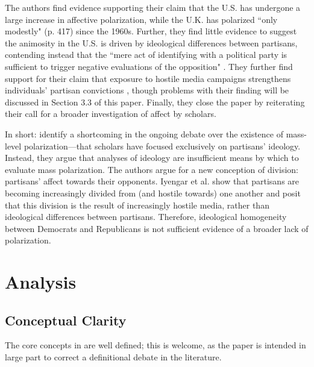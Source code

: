 \documentclass[12pt]{article}
\begin{document}
The authors find evidence supporting their claim that the U.S. has undergone a large increase in affective polarization, while the U.K. has polarized ``only modestly" (p. 417) since the 1960s. Further, they find little evidence to suggest the animosity in the U.S. is driven by ideological differences between partisans, contending instead that the ``mere act of identifying with a political party is sufficient to trigger negative evaluations of the opposition" \citep[p. 407]{iyengar2012affect}. They further find support for their claim that exposure to hostile media campaigns strengthens individuals' partisan convictions \citep[p. 407]{iyengar2012affect}, though problems with their finding will be discussed in Section 3.3 of this paper. Finally, they close the paper by reiterating their call for a broader investigation of affect by scholars.

In short: \citeauthor{iyengar2012affect} identify a shortcoming in the ongoing debate over the existence of mass-level polarization---that scholars have focused exclusively on partisans' ideology. Instead, they argue that analyses of ideology are insufficient means by which to evaluate mass polarization. The authors argue for a new conception of division: partisans' affect towards their opponents. Iyengar et al. show that partisans are becoming increasingly divided from (and hostile towards) one another and posit that this division is the result of increasingly hostile media, rather than ideological differences between partisans. Therefore, ideological homogeneity between Democrats and Republicans is not sufficient evidence of a broader lack of polarization.




\section{Analysis}
\subsection{Conceptual Clarity}
The core concepts in \citep{iyengar2012affect} are well defined; this is welcome, as the paper is intended in large part to correct a definitional debate in the literature. 
\end{document}

